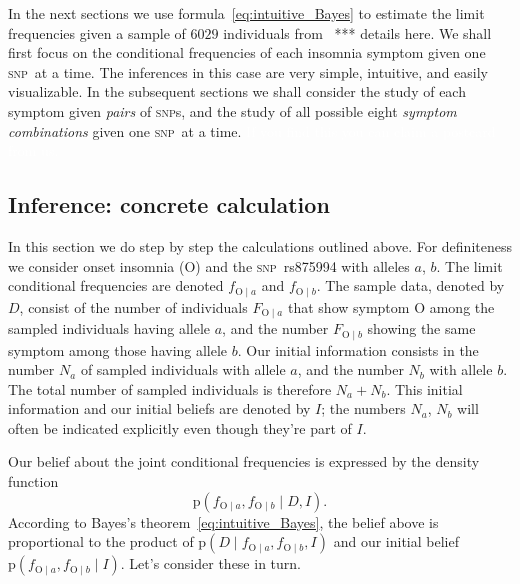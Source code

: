 \documentclass[\ifafour a4paper,12pt,\else a5paper,10pt,\fi%
onecolumn,oneside,article,%
british%
]{memoir}
\theoremstyle{remark}
\theoremstyle{innote}
\newcommand*{\pf}{\mathrm{p}}%
\renewcommand*{\|}{\mathpunct{|}}
\newcommand*{\puzzle}{\maltese}
\newcommand{\mynote}[1]{ {\color{notecolour}\puzzle\ #1}}
\newcommand*{\snp}{\textsc{snp}}
\newcommand*{\yD}{D}
\newcommand*{\yI}{I}
\newcommand*{\ya}{a}
\newcommand*{\yb}{b}
\newcommand*{\ysA}{\textrm{O}}%
\begin{document}
In the next sections we use formula~\eqref{eq:intuitive_Bayes} to estimate
the limit frequencies given a sample of $6029$ individuals from \mynote{***
  details here}. We shall first focus on the conditional frequencies of
each insomnia symptom given one \snp\ at a time. The inferences in this
case are very simple, intuitive, and easily visualizable. In the subsequent
sections we shall consider the study of each symptom given \emph{pairs} of
\snp s, and the study of all possible eight \emph{symptom combinations}
given one \snp\ at a time.
\textcolor{white}{If you find this you can claim a postcard from us.}

\subsection{Inference: concrete calculation}
\label{sec:inference}

In this section we do step by step the calculations outlined above. For
definiteness we consider onset insomnia ($\ysA$) and the \snp\ rs875994
with alleles $\ya$, $\yb$. The limit conditional frequencies are denoted
$f_{\ysA\|\ya}$ and $f_{\ysA\|\yb}$. The sample data, denoted by $\yD$,
consist of the number of individuals $F_{\ysA\|\ya}$ that show symptom
$\ysA$ among the sampled individuals having allele $\ya$, and the number
$F_{\ysA\|\yb}$ showing the same symptom among those having allele $\yb$.
Our initial information consists in the number $N_{\ya}$ of sampled
individuals with allele $\ya$, and the number $N_{\yb}$ with allele $\yb$.
The total number of sampled individuals is therefore $N_{\ya}+N_{\yb}$.
This initial information and our initial beliefs are denoted by $\yI$; the
numbers $N_{\ya}$, $N_{\yb}$ will often be indicated explicitly even though
they're part of $\yI$.

Our belief about the joint conditional frequencies is expressed by the
density function
\begin{equation}
  \label{eq:joint_belief_f}
  \pf(f_{\ysA\|\ya}, f_{\ysA\|\yb} \| \yD, \yI).
\end{equation}
According to Bayes's theorem~\eqref{eq:intuitive_Bayes}, the belief above
is proportional to the product of
$\pf(\yD \| f_{\ysA\|\ya}, f_{\ysA\|\yb}, \yI)$ and our initial belief
$\pf(f_{\ysA\|\ya}, f_{\ysA\|\yb} \| \yI)$. Let's consider these in turn.


\medskip
\end{document}
